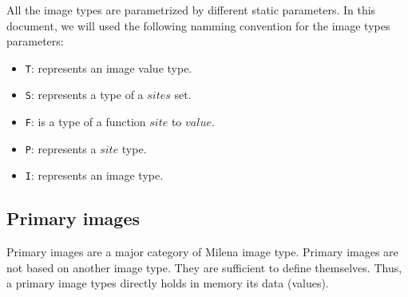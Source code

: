 All the image types are parametrized by different static parameters.
In this document, we will used the following namming convention for the
image types parameters:
\begin{itemize}
\item{\verb+T+:} represents an image value type.
\item{\verb+S+:} represents a type of a $sites$ set.
\item{\verb+F+:} is a type of a function $site$ to $value$.
\item{\verb+P+:} represents a $site$ type.
\item{\verb+I+:} represents an image type.
\end{itemize}

\subsection{Primary images}


Primary images are a major category of Milena image type.
Primary images are not based on another image type.
They are sufficient to define themselves.
Thus, a primary image types directly holds in memory its data (values).


